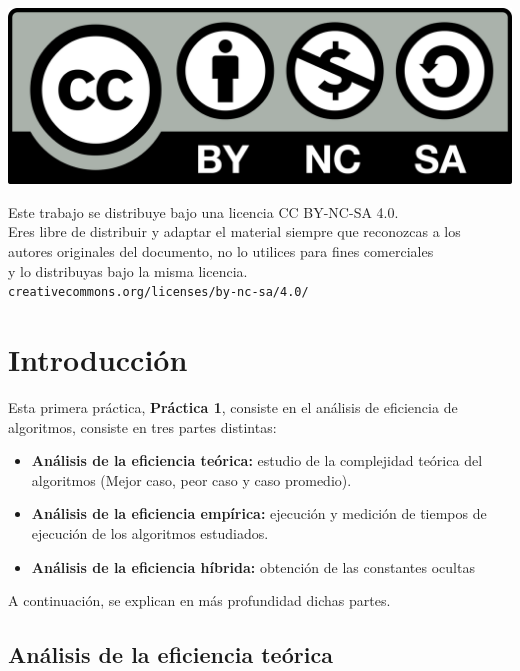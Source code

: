 \documentclass[10pt,a4paper]{article}
\begin{document}
\parbox[t]{\textwidth}{
  \includegraphics[scale=0.05]{by-nc-sa.png}\\[4pt]
  \raggedright %
  \sffamily\large
  {\Large Este trabajo se distribuye bajo una licencia CC BY-NC-SA 4.0.}\\[4pt]
  Eres libre de distribuir y adaptar el material siempre que reconozcas a los\\
  autores originales del documento, no lo utilices para fines comerciales\\
  y lo distribuyas bajo la misma licencia.\\[4pt]
  \texttt{creativecommons.org/licenses/by-nc-sa/4.0/}
}

\newpage

\tableofcontents

\newpage
\section{Introducción}

Esta primera práctica, \textbf{Práctica 1}, consiste en el análisis de eficiencia de algoritmos, consiste en tres partes distintas:
\begin{itemize}
	\item \textbf{Análisis de la eficiencia teórica:} estudio de la complejidad teórica del algoritmos (Mejor caso, peor caso y caso promedio).
	\item \textbf{Análisis de la eficiencia empírica:} ejecución y medición de tiempos de ejecución de los algoritmos estudiados.
	\item \textbf{Análisis de la eficiencia híbrida:} obtención de las constantes ocultas
\end{itemize}

A continuación, se explican en más profundidad dichas partes.

\subsection{Análisis de la eficiencia teórica}
\end{document}
